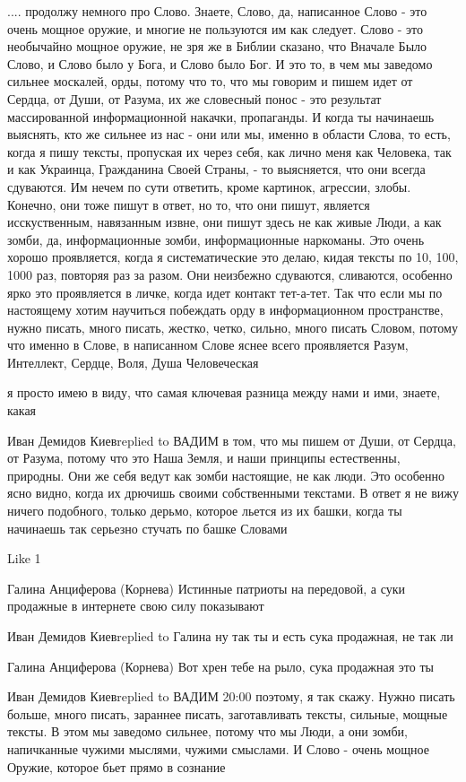  
 
 
 
 

.... продолжу немного про Слово. Знаете, Слово, да, написанное Слово - это
очень мощное оружие, и многие не пользуются им как следует. Слово - это
необычайно мощное оружие, не зря же в Библии сказано, что Вначале Было Слово, и
Слово было у Бога, и Слово было Бог. И это то, в чем мы заведомо сильнее
москалей, орды, потому что то, что мы говорим и пишем идет от Сердца, от Души,
от Разума, их же словесный понос - это результат массированной информационной
накачки, пропаганды. И когда ты начинаешь выяснять, кто же сильнее из нас - они
или мы, именно в области Слова, то есть, когда я пишу тексты, пропуская их
через себя, как лично меня как Человека, так и как Украинца, Гражданина Своей
Страны, - то выясняется, что они всегда сдуваются. Им нечем по сути ответить,
кроме картинок, агрессии, злобы. Конечно, они тоже пишут в ответ, но то, что
они пишут, является исскуственным, навязанным извне, они пишут здесь не как
живые Люди, а как зомби, да, информационные зомби, информационные наркоманы.
Это очень хорошо проявляется, когда я систематические это делаю, кидая тексты
по 10, 100, 1000 раз, повторяя раз за разом. Они неизбежно сдуваются,
сливаются, особенно ярко это проявляется в личке, когда идет контакт тет-а-тет.
Так что если мы по настоящему хотим научиться побеждать орду в информационном
пространстве, нужно писать, много писать, жестко, четко, сильно, много писать
Словом, потому что именно в Слове, в написанном Слове яснее всего проявляется
Разум, Интеллект, Сердце, Воля, Душа Человеческая

я просто имею в виду, что самая ключевая разница между нами и ими, знаете, какая

Иван Демидов Киевreplied to ВАДИМ
в том, что мы пишем от Души, от Сердца, от Разума, потому что это Наша Земля, и наши принципы естественны, природны. Они же себя ведут как зомби настоящие, не как люди. Это особенно ясно видно, когда их дрючишь своими собственными текстами. В ответ я не вижу ничего подобного, только дерьмо, которое льется из их башки, когда ты начинаешь так серьезно стучать по башке Словами

    Like 1

Галина Анциферова (Корнева)
Истинные патриоты на передовой, а суки продажные в интернете свою силу показывают

Иван Демидов Киевreplied to Галина
ну так ты и есть сука продажная, не так ли

Галина Анциферова (Корнева)
Вот хрен тебе на рыло, сука продажная это ты

Иван Демидов Киевreplied to ВАДИМ
20:00
поэтому, я так скажу. Нужно писать больше, много писать, зараннее писать, заготавливать тексты, сильные, мощные тексты. В этом мы заведомо сильнее, потому что мы Люди, а они зомби, напичканные чужими мыслями, чужими смыслами. И Слово - очень мощное Оружие, которое бьет прямо в сознание
